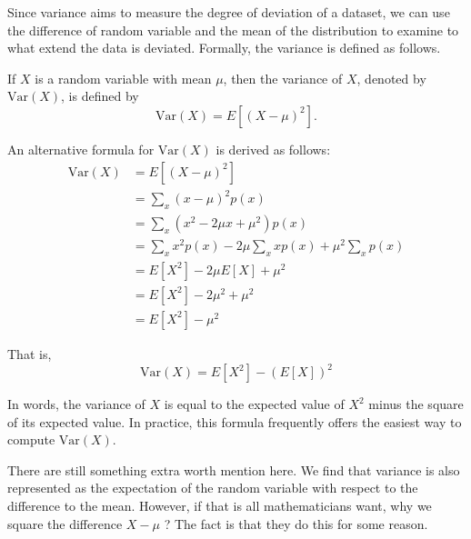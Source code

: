 Since variance aims to measure the degree of deviation of a dataset, we can use the difference of random variable and the mean of the distribution to examine to what extend the data is deviated. Formally, the variance is defined as follows.

\begin{definition}
If \( X \) is a random variable with mean \( \mu \), then the variance of \( X \), denoted by \( \text{Var}(X) \), is defined by
\[
\text{Var}(X) = {E}[(X - \mu)^2].
\]
\end{definition}

An alternative formula for \( \text{Var}(X) \) is derived as follows:
\[
\begin{aligned}
\text{Var}(X) &= {E}[(X - \mu)^2] \\
&= \sum_x (x - \mu)^2 p(x) \\
&= \sum_x (x^2 - 2\mu x + \mu^2) p(x) \\
&= \sum_x x^2 p(x) - 2\mu \sum_x x p(x) + \mu^2 \sum_x p(x) \\
&= {E}[X^2] - 2\mu {E}[X] + \mu^2 \\
&= {E}[X^2] - 2\mu^2 + \mu^2 \\
&= {E}[X^2] - \mu^2
\end{aligned}
\]

That is,
\[
\boxed{\text{Var}(X) = {E}[X^2] - ({E}[X])^2}
\]

In words, the variance of \( X \) is equal to the expected value of \( X^2 \) minus the square of its expected value. In practice, this formula frequently offers the easiest way to compute \( \text{Var}(X) \).

There are still something extra worth mention here. We find that variance is also represented as the expectation of the random variable with respect to the difference to the mean. However, if that is all mathematicians want, why we square the difference $X-\mu$ ? The fact is that they do this for some reason.


